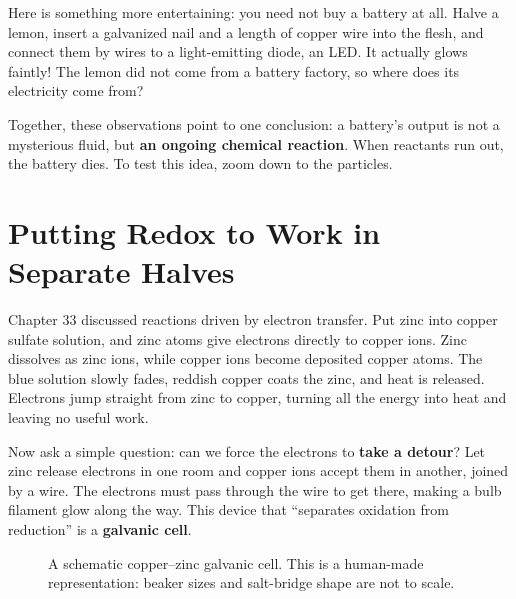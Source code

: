 Here is something more entertaining: you need not buy a battery at all. Halve a lemon, insert a galvanized nail and a length of copper wire into the flesh, and connect them by wires to a light-emitting diode, an LED. It actually glows faintly! The lemon did not come from a battery factory, so where does its electricity come from?

Together, these observations point to one conclusion: a battery's output is not a mysterious fluid, but \textbf{an ongoing chemical reaction}. When reactants run out, the battery dies. To test this idea, zoom down to the particles.

\section{Putting Redox to Work in Separate Halves}

Chapter 33 discussed reactions driven by electron transfer. Put zinc into copper sulfate solution, and zinc atoms give electrons directly to copper ions. Zinc dissolves as zinc ions, while copper ions become deposited copper atoms. The blue solution slowly fades, reddish copper coats the zinc, and heat is released. Electrons jump straight from zinc to copper, turning all the energy into heat and leaving no useful work.

Now ask a simple question: can we force the electrons to \textbf{take a detour}? Let zinc release electrons in one room and copper ions accept them in another, joined by a wire. The electrons must pass through the wire to get there, making a bulb filament glow along the way. This device that ``separates oxidation from reduction'' is a \textbf{galvanic cell}.

\begin{figure}[htbp]
\centering
{}
\caption{A schematic copper--zinc galvanic cell. This is a human-made representation: beaker sizes and salt-bridge shape are not to scale.}
\end{figure}

